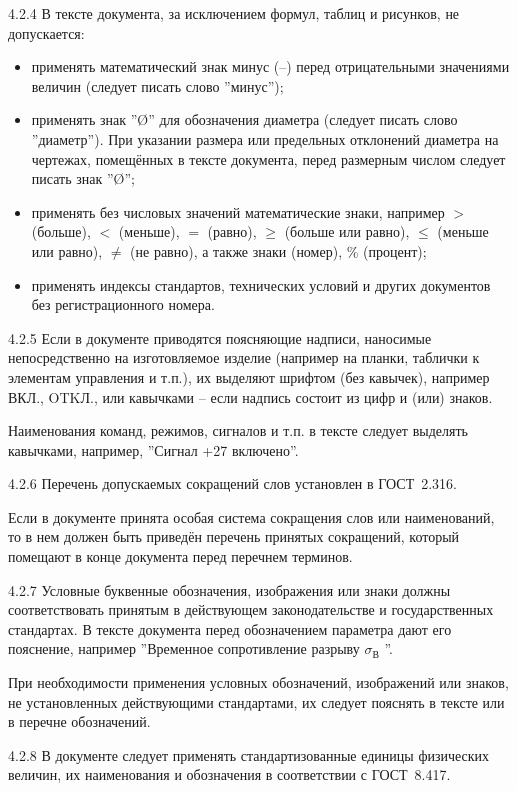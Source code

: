 4.2.4 В тексте документа, за исключением формул, таблиц и рисунков, не допускается:
\begin{itemize}
  \item применять математический знак минус (–) перед отрицательными значениями величин (следует писать слово ''минус'');
  \item применять знак ''\O'' для обозначения диаметра (следует писать слово ''диаметр''). При указании размера или предельных отклонений диаметра на чертежах, помещённых в тексте документа, перед размерным числом следует писать знак ''\O'';
  \item применять без числовых значений математические знаки, например $>$ (больше), $<$ (меньше), $=$ (равно), $\geq$ (больше или равно), $\leq$ (меньше или равно), $\neq$ (не равно), а также знаки \textnumero (номер), \% (процент);
  \item применять индексы стандартов, технических условий и других документов без регистрационного номера.
\end{itemize}

4.2.5 Если в документе приводятся поясняющие надписи, наносимые непосредственно на изготовляемое изделие (например на планки, таблички к элементам управления и т.п.), их выделяют шрифтом (без кавычек), например ВКЛ., OTKЛ., или кавычками – если надпись состоит из цифр и (или) знаков.

Наименования команд, режимов, сигналов и т.п. в тексте следует выделять кавычками, например, ''Сигнал +27 включено''.

4.2.6 Перечень допускаемых сокращений слов установлен в ГОСТ~2.316.

Если в документе принята особая система сокращения слов или наименований, то в нем должен быть приведён перечень принятых сокращений, который помещают в конце документа перед перечнем терминов.

4.2.7 Условные буквенные обозначения, изображения или знаки должны соответствовать принятым в действующем законодательстве и государственных стандартах. В тексте документа перед обозначением параметра дают его пояснение, например ''Временное сопротивление разрыву $\sigma_В$ ''.

При необходимости применения условных обозначений, изображений или знаков, не установленных действующими стандартами, их следует пояснять в тексте или в перечне обозначений.

4.2.8 В документе следует применять стандартизованные единицы физических величин, их наименования и обозначения в соответствии с ГОСТ~8.417.

